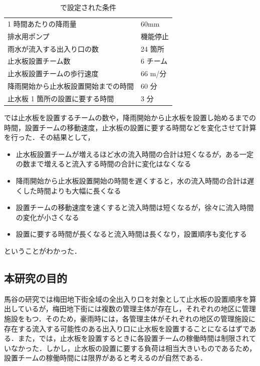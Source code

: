 \documentclass[a4paper,12pt,fleqn]{jarticle}
\begin{document}
\begin{table}[H]
  \begin{center}
    \caption{\cite{馬谷さん卒論}で設定された条件}
    \begin{tabular}{ll}
      \hline
      1 時間あたりの降雨量 & 60mm \\
      排水用ポンプ & 機能停止 \\
      雨水が流入する出入り口の数 & 24 箇所 \\
      止水板設置チーム数 & 6 チーム \\
      止水板設置チームの歩行速度 & 66 m/分\\
      降雨開始から止水板設置開始までの時間 & 60 分 \\
      止水板 1 箇所の設置に要する時間 & 3 分 \\
      \hline
    \end{tabular}
    \label{tb:ex1}
  \end{center}
\end{table}

\cite{馬谷さん卒論}では止水板を設置するチームの数や，降雨開始から止水板を設置し始めるまでの時間，設置チームの移動速度，止水板の設置に要する時間などを変化させて計算を行った．その結果として，

\begin{itemize}
\item 止水板設置チームが増えるほど水の流入時間の合計は短くなるが，ある一定の数まで増えると流入する時間の合計に変化はなくなる
\item 降雨開始から止水板設置開始の時間を遅くすると，水の流入時間の合計は遅くした時間よりも大幅に長くなる
\item 設置チームの移動速度を速くすると流入時間は短くなるが，徐々に流入時間の変化が小さくなる
\item 設置に要する時間が長くなると流入時間は長くなり，設置順序も変化する
\end{itemize}

ということがわかった．

\subsection{本研究の目的}

馬谷の研究\cite{馬谷さん卒論}では梅田地下街全域の全出入り口を対象として止水板の設置順序を算出しているが，梅田地下街には複数の管理主体が存在し，それぞれの地区に管理施設をもつ．そのため，豪雨時には，各管理主体がそれぞれの地区の管理施設に存在する流入する可能性のある出入り口に止水板を設置することになるはずである．また，\cite{馬谷さん卒論}では，止水板を設置するときに各設置チームの稼働時間は制限されていなかった．しかし，止水板の設置に要する負荷は相当大きいものであるため，設置チームの稼働時間には限界があると考えるのが自然である．
\end{document}
